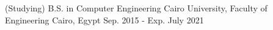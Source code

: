 

\begin{cventries}

  \cvedu
    {(Studying) B.S. in Computer Engineering} %
    {Cairo University, Faculty of Engineering} %
    {Cairo, Egypt} %
    {Sep. 2015 - Exp. July 2021} %
\end{cventries}
